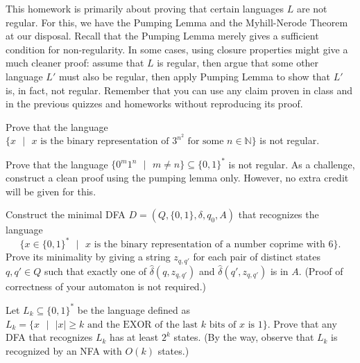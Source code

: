 \documentclass[10pt,addpoints]{exam}
\begin{document}
%
%
\noindent This homework is primarily about proving that certain languages $L$ are not regular. For this, we have the Pumping Lemma and the Myhill-Nerode Theorem at our disposal. Recall that the Pumping Lemma merely gives a sufficient condition for non-regularity. In some cases, using closure properties might give a much cleaner proof: assume that $L$ is regular, then argue that some other language $L'$ must also be regular, then apply Pumping Lemma to show that $L'$ is, in fact, not regular. Remember that you can use any claim proven in class and in the previous quizzes and homeworks without reproducing its proof.


\begin{prob}
Prove that the language $\{x\text{ }|\text{ }x\text{ is the binary representation of }3^{n^2}\text{ for some }n\in\mathbb{N}\}$ is not regular.
\end{prob}



\newpage
\begin{prob}
Prove that the language $\{0^m1^n\text{ }|\text{ }m\neq n\}\subseteq\{0,1\}^*$ is not regular.
As a challenge, construct a clean proof using the pumping lemma only. However, no extra credit will be given for this.
\end{prob}



\newpage

\begin{prob}
Construct the minimal DFA $D=(Q,\{0,1\},\delta,q_0,A)$ that recognizes the language
\[\{x\in\{0,1\}^*\text{ }|\text{ }x\text{ is the binary representation of a number coprime with }6\}\text{.}\]
Prove its minimality by giving a string $z_{q,q'}$ for each pair of distinct states $q,q'\in Q$ such that exactly one of $\widehat{\delta}(q,z_{q,q'})$ and $\widehat{\delta}(q',z_{q,q'})$ is in $A$. (Proof of correctness of your automaton is not required.)
\end{prob}



\newpage
\begin{prob}
Let $L_k\subseteq\{0,1\}^*$ be the language defined as $L_k=\{x\text{ }|\text{ }|x|\geq k\text{ and the EXOR of the last }k\text{ bits of }x\text{ is }1\}$. Prove that any DFA that recognizes $L_k$ has at least $2^k$ states. (By the way, observe that $L_k$ is recognized by an NFA with $O(k)$ states.)
\end{prob}

\end{document}
